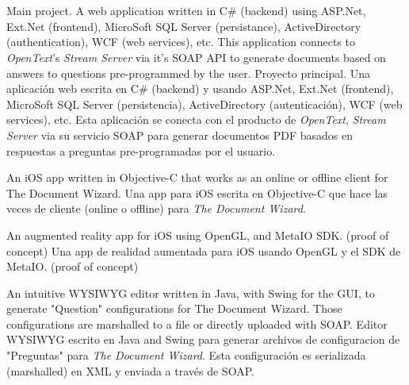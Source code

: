 \section{}


    {\ml
    {Main project. A web application written in C\# (backend) using ASP.Net,
    Ext.Net (frontend), MicroSoft SQL Server (persistance), ActiveDirectory
    (authentication), WCF (web services), etc. This application connects to
    \textit{OpenText}'s \textit{Stream Server} via it's SOAP API to generate
    documents based on answers to questions pre-programmed by the user.}
    {Proyecto principal. Una aplicación web escrita en C\# (backend) y usando
    ASP.Net, Ext.Net (frontend), MicroSoft SQL Server (persistencia),
    ActiveDirectory (autenticación), WCF (web services), etc. Esta aplicación
    se conecta con el producto de \textit{OpenText}, \textit{Stream Server} via
    su servicio SOAP para generar documentos PDF basados en respuestas a
    preguntas pre-programadas por el usuario.}
}


    {\ml
    {An iOS app written in Objective-C that works as an online or offline client
    for The Document Wizard.}
    {Una app para iOS escrita en Objective-C que hace las veces de cliente
    (online o offline) para \textit{The Document Wizard}.}
}


    {\ml
    {An augmented reality app for iOS using OpenGL, and MetaIO SDK. (proof of concept)}
    {Una app de realidad aumentada para iOS usando OpenGL y el SDK de MetaIO. (proof of concept)}
}


    {\ml
    {An intuitive WYSIWYG editor written in Java, with Swing for the GUI, to
    generate "Question" configurations for The Document Wizard.  Those
    configurations are marshalled to a file or directly uploaded with SOAP.}
    {Editor WYSIWYG escrito en Java and Swing para generar archivos de
    configuracion de "Preguntas" para \textit{The Document Wizard}. Esta
    configuración es serializada (marshalled) en XML y enviada a través de
    SOAP.}
}


